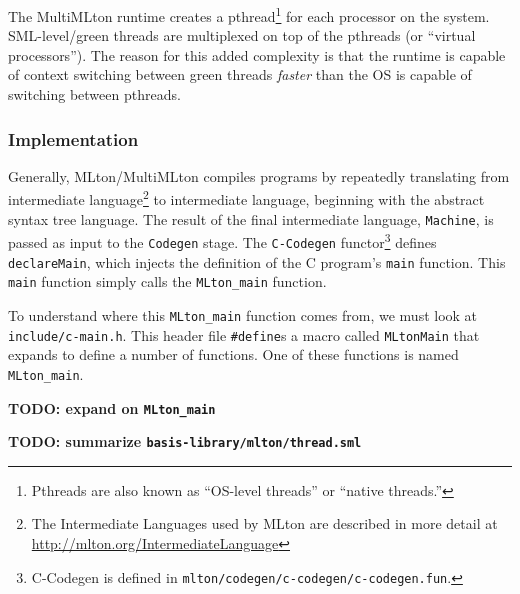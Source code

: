 \documentclass{article}
\begin{document}
The MultiMLton runtime creates a pthread\footnote{Pthreads are also
  known as ``OS-level threads'' or ``native threads.''} for each
processor on the system.  SML-level/green threads are multiplexed on
top of the pthreads (or ``virtual processors''). The reason for this
added complexity is that the runtime is capable of context switching
between green threads \textit{faster} than the OS is capable of
switching between pthreads.

\subsubsection{Implementation}

Generally, MLton/MultiMLton compiles programs by repeatedly
translating from intermediate language\footnote{The Intermediate
  Languages used by MLton are described in more detail at
  \url{http://mlton.org/IntermediateLanguage}} to intermediate
language, beginning with the abstract syntax tree language.  The
result of the final intermediate language, \texttt{Machine}, is passed
as input to the \texttt{Codegen} stage.  The \texttt{C-Codegen}
functor\footnote{C-Codegen is defined in
  \texttt{mlton/codegen/c-codegen/c-codegen.fun}.} defines
\texttt{declareMain}, which injects the definition of the C program's
\texttt{main} function.  This \texttt{main} function simply calls the
\texttt{MLton\_main} function.

To understand where this \texttt{MLton\_main} function comes from, we
must look at \texttt{include/c-main.h}. This header file
\texttt{\#define}s a macro called \texttt{MLtonMain} that expands to
define a number of functions. One of these functions is named
\texttt{MLton\_main}.

\textbf{TODO: expand on \texttt{MLton\_main}}

\textbf{TODO: summarize \texttt{basis-library/mlton/thread.sml}}
\end{document}
